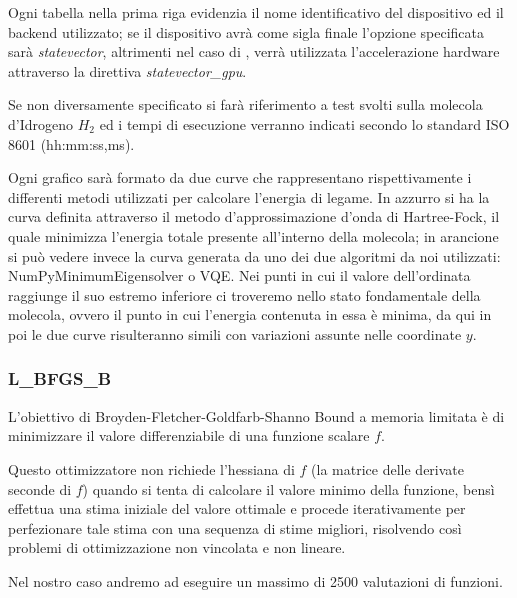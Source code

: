 Ogni tabella nella prima riga evidenzia il nome identificativo del dispositivo ed il backend utilizzato; se il dispositivo avrà come sigla finale  l'opzione specificata sarà \textit{statevector}, altrimenti nel caso di , verrà utilizzata l'accelerazione hardware attraverso la direttiva \textit{statevector\_gpu}.

Se non diversamente specificato si farà riferimento a test svolti sulla molecola d'Idrogeno $H_2$ ed i tempi di esecuzione verranno indicati secondo lo standard ISO 8601 (hh:mm:ss,ms).

Ogni grafico sarà formato da due curve che rappresentano rispettivamente i differenti metodi utilizzati per calcolare l'energia di legame.
In azzurro si ha la curva definita attraverso il metodo d'approssimazione d'onda di Hartree-Fock, il quale minimizza l'energia totale presente all'interno della molecola; in arancione si può vedere invece la curva generata da uno dei due algoritmi da noi utilizzati: NumPyMinimumEigensolver o VQE.
Nei punti in cui il valore dell'ordinata raggiunge il suo estremo inferiore ci troveremo nello stato fondamentale della molecola, ovvero il punto in cui l'energia contenuta in essa è minima, da qui in poi le due curve risulteranno simili con variazioni assunte nelle coordinate $y$.

\subsubsection{L\_BFGS\_B}
L'obiettivo di Broyden-Fletcher-Goldfarb-Shanno Bound a memoria limitata è di minimizzare il valore differenziabile di una funzione scalare $f$.

Questo ottimizzatore non richiede l'hessiana di $f$ (la matrice delle derivate seconde di $f$) quando si tenta di calcolare il valore minimo della funzione, bensì effettua una stima iniziale del valore ottimale e procede iterativamente per perfezionare tale stima con una sequenza di stime migliori, risolvendo così problemi di ottimizzazione non vincolata e non lineare.

Nel nostro caso andremo ad eseguire un massimo di 2500 valutazioni di funzioni.

